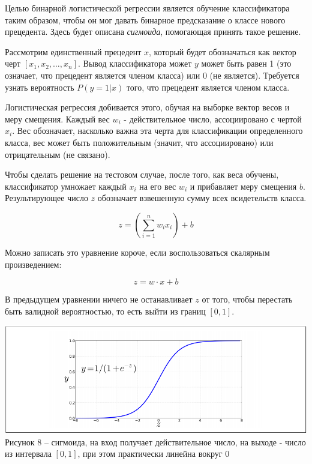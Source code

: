 \documentclass[a4paper,12pt,preview]{report} %
\begin{document}
	Целью бинарной логистической регрессии является обучение классификатора таким образом, чтобы он мог давать бинарное предсказание о классе нового прецедента. Здесь будет описана \textit{сигмоида}, помогающая принять такое решение.
	
	Рассмотрим единственный прецедент $x$, который будет обозначаться как вектор черт $[x_1, x_2, \dots, x_n]$. Вывод классификатора может $y$ может быть равен 1 (это означает, что прецедент является членом класса) или 0 (не является). Требуется узнать вероятность $P(y = 1 | x)$ того, что прецедент является членом класса.
	
	Логистическая регрессия добивается этого, обучая на выборке вектор весов и меру смещения. Каждый вес $w_i$ - действительное число, ассоциировано с чертой $x_i$. Вес обозначает, насколько важна эта черта для классификации определенного класса, вес может быть положительным (значит, что ассоциировано) или отрицательным (не связано). 
	
	Чтобы сделать решение на тестовом случае, после того, как веса обучены, классификатор умножает каждый $x_i$ на его вес $w_i$ и прибавляет меру смещения $b$. Результирующее число $z$ обозначает взвешенную сумму всех всидетельств класса.
	
	\begin{equation}
	z = (\sum_{i=1}^n w_i x_i) + b
	\end{equation}
	
	Можно записать это уравнение короче, если воспользоваться скалярным произведением:
	
	\begin{equation}
	z = w \cdot x + b
	\end{equation}
	
	
	В предыдущем уравнении ничего не останавливает $z$ от того, чтобы перестать быть валидной вероятностью, то есть выйти из границ $[0, 1]$.  
	
	\begin{center}
		\includegraphics[scale=0.8]{sigmoid.PNG}
		\\ Рисунок 8 -- сигмоида, на вход получает действительное число, на выходе - число из интервала $[0, 1]$, при этом практически линейна вокруг 0
	\end{center}
	
\end{document}
